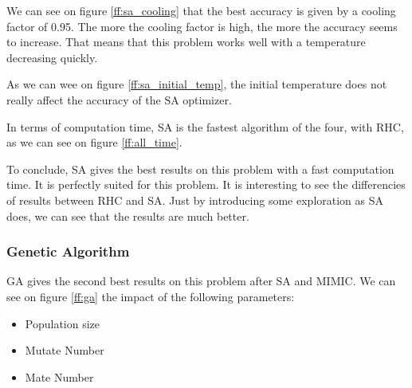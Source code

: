 \documentclass[10pt]{article}
\begin{document}
				We can see on figure \ref{ff:sa_cooling} that the best accuracy is given by a cooling factor of 0.95. The more the cooling factor is high, the more the accuracy seems to increase. That means that this problem works well with a temperature decreasing quickly.

				As we can wee on figure \ref{ff:sa_initial_temp}, the initial temperature does not really affect the accuracy of the SA optimizer.

				In terms of computation time, SA is the fastest algorithm of the four, with RHC, as we can see on figure \ref{ff:all_time}.

				To conclude, SA gives the best results on this problem with a fast computation time. It is perfectly suited for this problem. It is interesting to see the differencies of results between RHC and SA. Just by introducing some exploration as SA does, we can see that the results are much better.
			\subsubsection*{Genetic Algorithm}
				GA gives the second best results on this problem after SA and MIMIC. We can see on figure \ref{ff:ga} the impact of the following parameters:
				\begin{itemize}
					\item Population size
					\item Mutate Number
					\item Mate Number
				\end{itemize}
\end{document}
